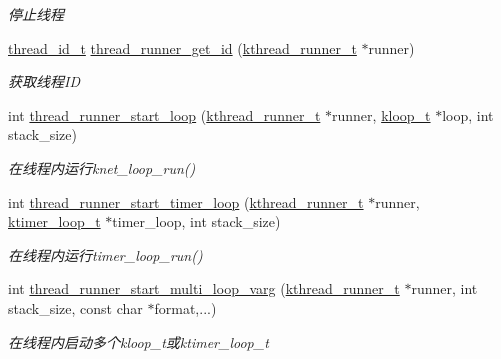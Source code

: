 \begin{DoxyCompactItemize}
\begin{DoxyCompactList}\small\item\em 停止线程 \end{DoxyCompactList}\item 
\hyperlink{a00051_ad0ada5642d10ce71bdd90816182f9b79_ad0ada5642d10ce71bdd90816182f9b79}{thread\+\_\+id\+\_\+t} \hyperlink{a00109_ga1f1e994ba4c42e91e4d4b120aa8eb970_ga1f1e994ba4c42e91e4d4b120aa8eb970}{thread\+\_\+runner\+\_\+get\+\_\+id} (\hyperlink{a00051_a4f78c259c9527c821f1a6f87495dd339_a4f78c259c9527c821f1a6f87495dd339}{kthread\+\_\+runner\+\_\+t} $\ast$runner)
\begin{DoxyCompactList}\small\item\em 获取线程\+I\+D \end{DoxyCompactList}\item 
int \hyperlink{a00109_ga4328cb11f2446f4da89374a1ae8a2f8e_ga4328cb11f2446f4da89374a1ae8a2f8e}{thread\+\_\+runner\+\_\+start\+\_\+loop} (\hyperlink{a00051_a4f78c259c9527c821f1a6f87495dd339_a4f78c259c9527c821f1a6f87495dd339}{kthread\+\_\+runner\+\_\+t} $\ast$runner, \hyperlink{a00051_a97fc76209a58362019f1ded9169e397f_a97fc76209a58362019f1ded9169e397f}{kloop\+\_\+t} $\ast$loop, int stack\+\_\+size)
\begin{DoxyCompactList}\small\item\em 在线程内运行knet\+\_\+loop\+\_\+run() \end{DoxyCompactList}\item 
int \hyperlink{a00109_ga943c1e0bc78abe3d7faae24ae3670d9a_ga943c1e0bc78abe3d7faae24ae3670d9a}{thread\+\_\+runner\+\_\+start\+\_\+timer\+\_\+loop} (\hyperlink{a00051_a4f78c259c9527c821f1a6f87495dd339_a4f78c259c9527c821f1a6f87495dd339}{kthread\+\_\+runner\+\_\+t} $\ast$runner, \hyperlink{a00051_a024af2aa29615e7a811ea6c45438157d_a024af2aa29615e7a811ea6c45438157d}{ktimer\+\_\+loop\+\_\+t} $\ast$timer\+\_\+loop, int stack\+\_\+size)
\begin{DoxyCompactList}\small\item\em 在线程内运行timer\+\_\+loop\+\_\+run() \end{DoxyCompactList}\item 
int \hyperlink{a00109_ga80fabbe64d1fc33e81053e51f69772d2_ga80fabbe64d1fc33e81053e51f69772d2}{thread\+\_\+runner\+\_\+start\+\_\+multi\+\_\+loop\+\_\+varg} (\hyperlink{a00051_a4f78c259c9527c821f1a6f87495dd339_a4f78c259c9527c821f1a6f87495dd339}{kthread\+\_\+runner\+\_\+t} $\ast$runner, int stack\+\_\+size, const char $\ast$format,...)
\begin{DoxyCompactList}\small\item\em 在线程内启动多个kloop\+\_\+t或ktimer\+\_\+loop\+\_\+t \end{DoxyCompactList}\item 

\end{DoxyCompactItemize}
